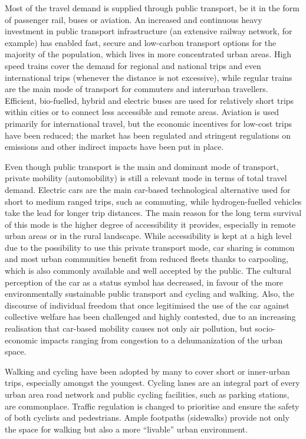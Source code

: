 {Most of the travel demand is supplied through public transport, be it in the form of passenger rail, buses or aviation. An increased and continuous heavy investment in public transport infrastructure (an extensive railway network, for example) has enabled fast, secure and low-carbon transport options for the majority of the population, which lives in more concentrated urban areas. High speed trains cover the demand for regional and national trips and even international trips (whenever the distance is not excessive), while regular trains are the main mode of transport for commuters and interurban travellers. Efficient, bio-fuelled, hybrid and electric buses are used for relatively short trips within cities or to connect less accessible and remote areas. Aviation is used primarily for international travel, but the economic incentives for low-cost trips have been reduced; the market has been regulated and stringent regulations on emissions and other indirect impacts have been put in place.

Even though public transport is the main and dominant mode of transport, private mobility (automobility) is still a relevant mode in terms of total travel demand. Electric cars are the main car-based technological alternative used for short to medium ranged trips, such as commuting, while hydrogen-fuelled vehicles take the lead for longer trip distances. The main reason for the long term survival of this mode is the higher degree of accessibility it provides, especially in remote urban areas or in the rural landscape. While accessibility is kept at a high level due to the possibility to use this private transport mode, car sharing is common and most urban communities benefit from reduced fleets thanks to carpooling, which is also commonly available and well accepted by the public. The cultural perception of the car as a status symbol has decreased, in favour of the more environmentally sustainable public transport and cycling and walking. Also, the discourse of individual freedom that once legitimised the use of the car against collective welfare has been challenged and highly contested, due to an increasing realisation that car-based mobility causes not only air pollution, but socio-economic impacts ranging from congestion to a dehumanization of the urban space.

Walking and cycling have been adopted by many to cover short or inner-urban trips, especially amongst the youngest. Cycling lanes are an integral part of every urban area road network and public cycling facilities, such as parking stations, are commonplace. Traffic regulation is changed to prioritise and ensure the safety of both cyclists and pedestrians. Ample footpaths (sidewalks) provide not only the space for walking but also a more ``livable'' urban environment.
}

